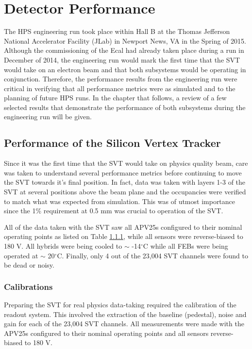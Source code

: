 
\chapter{Detector Performance}

The HPS engineering run took place within Hall B at the Thomas Jefferson 
National Accelerator Facility (JLab) in Newport News, VA in the Spring of 2015.
Although the commissioning of the Ecal had already taken place during a run in 
December of 2014, the engineering run would mark the first time that the SVT 
would take on an electron beam and that both subsystems would be operating in 
conjunction.  Therefore, the performance results from the engineering run were
critical in verifying that all performance metrics were as simulated and to the
planning of future HPS runs.  In the chapter that follows, a review of a few
selected results that demonstrate the performance of both subsystems during the
engineering run will be given.

\section{Performance of the Silicon Vertex Tracker}

Since it was the first time that the SVT would take on physics quality beam, 
care was taken to understand several performance metrics before continuing to
move the SVT towards it's final position. 
In fact, data was taken with layers 1-3 of the SVT at several positions above the
beam plane and the occupancies were verified
to match what was expected from simulation.  This was of utmost  
importance since the 1\% requirement at 0.5 mm was crucial to operation of the
SVT. 

All of the data taken with the SVT saw all APV25s configured to their nominal
operating points as listed on Table \ref{}, while all sensors were reverse-biased
to 180 V. All hybrids were being cooled to $\sim$ -14$^{\circ}$C while all FEBs
were being operated at $\sim$ 20$^{\circ}$C.  Finally, only 4 out of the 23,004
SVT channels were found to be dead or noisy.

\subsection{Calibrations}

Preparing the SVT for real physics data-taking required the calibration of the
readout system. This involved the extraction of the baseline 
(pedestal), noise and gain for each of the 23,004 SVT channels.  All 
measurements were made with the APV25s configured to their nominal operating
points and all sensors reverse-biased to 180 V.

